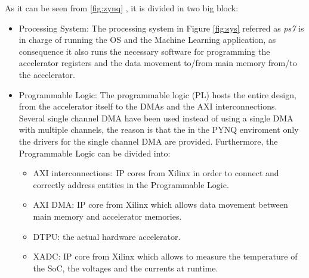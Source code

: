 As it can be seen from \ref{fig:zynq} , it is divided in two big block:
\begin{itemize}
\item Processing System:
The processing system in Figure \ref{fig:sys} referred as \textit{ps7} is in charge of running the OS and the Machine Learning application, as consequence it also runs the necessary software for programming the accelerator registers and the data movement to/from main memory from/to the accelerator.
\item Programmable Logic:
The programmable logic (PL) hosts the entire design, from the accelerator itself to the DMAs and the AXI interconnections.\\ Several single channel DMA have been used instead of using a single DMA with multiple channels, the reason is that the in the PYNQ enviroment only the drivers for the single channel DMA are provided. Furthermore, the Programmable Logic can be divided into:
\begin{itemize}
\item AXI interconnections: IP cores from Xilinx\cite{paper:34}\cite{paper:35} in order to connect and correctly address entities in the Programmable Logic.
\item AXI DMA: IP core from Xilinx \cite{paper:33} which allows data movement between main memory and accelerator memories.
\item DTPU: the actual hardware accelerator.
\item XADC: IP core from Xilinx \cite{paper:32} which allows to measure the temperature of the SoC, the voltages and the currents at runtime.

\end{itemize}

\end{itemize}

